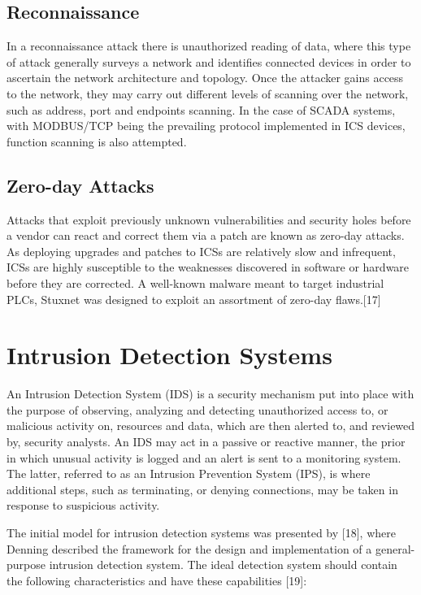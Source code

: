 \documentclass[11pt,]{article}
\begin{document}
\subsection{Reconnaissance}\label{reconnaissance}

In a reconnaissance attack there is unauthorized reading of data, where
this type of attack generally surveys a network and identifies connected
devices in order to ascertain the network architecture and topology.
Once the attacker gains access to the network, they may carry out
different levels of scanning over the network, such as address, port and
endpoints scanning. In the case of SCADA systems, with MODBUS/TCP being
the prevailing protocol implemented in ICS devices, function scanning is
also attempted.

\subsection{Zero-day Attacks}\label{zero-day-attacks}

Attacks that exploit previously unknown vulnerabilities and security
holes before a vendor can react and correct them via a patch are known
as zero-day attacks. As deploying upgrades and patches to ICSs are
relatively slow and infrequent, ICSs are highly susceptible to the
weaknesses discovered in software or hardware before they are corrected.
A well-known malware meant to target industrial PLCs, Stuxnet was
designed to exploit an assortment of zero-day flaws.{[}17{]}

\newpage

\section{Intrusion Detection Systems}\label{intrusion-detection-systems}

An Intrusion Detection System (IDS) is a security mechanism put into
place with the purpose of observing, analyzing and detecting
unauthorized access to, or malicious activity on, resources and data,
which are then alerted to, and reviewed by, security analysts. An IDS
may act in a passive or reactive manner, the prior in which unusual
activity is logged and an alert is sent to a monitoring system. The
latter, referred to as an Intrusion Prevention System (IPS), is where
additional steps, such as terminating, or denying connections, may be
taken in response to suspicious activity.

The initial model for intrusion detection systems was presented by
{[}18{]}, where Denning described the framework for the design and
implementation of a general-purpose intrusion detection system. The
ideal detection system should contain the following characteristics and
have these capabilities {[}19{]}:
\end{document}
